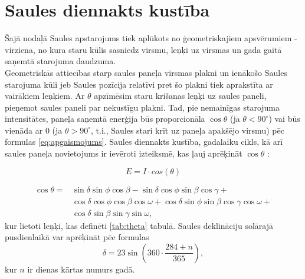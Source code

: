 
\section{Saules diennakts kustība}

Šajā nodaļā Saules apstarojums tiek aplūkots no ģeometriskajiem apsvērumiem - virziena, no kura staru kūlis sasniedz virsmu, leņķi uz virsmas un gada gaitā saņemtā starojuma daudzuma.\\
Ģeometriskās attiecības starp saules paneļa virsmas plakni un ienākošo Saules starojuma kūli jeb Saules pozīcija relatīvi pret šo plakni tiek aprakstīta ar vairākiem leņķiem. Ar $\theta$ apzīmēsim staru krišanas leņķi uz saules paneli, pieņemot saules paneli par nekustīgu plakni. Tad, pie nemainīgas starojuma intensitātes, paneļa saņemtā enerģija būs proporcionāla $\cos{\theta}$ (ja $\theta<90^\circ$) vai būs vienāda ar 0 (ja $\theta>90^\circ$, t.i., Saules stari krīt uz paneļa apakšējo virsmu) pēc formulas \ref{eq:apgaismojums}. Saules diennakts kustība, gadalaiku cikls, kā arī saules paneļa novietojums ir ievēroti izteiksmē, kas ļauj aprēķināt $\cos{\theta}$ \cite{ThermalProcesses}:

\begin{equation}
\label{eq:apgaismojums}
E = I \cdot cos(\theta)
\end{equation}

\begin{equation}
\label{eq:theta}
\begin{aligned}
	\cos{\theta} = {} & \sin{\delta} \sin{\phi} \cos{\beta} - \sin{\delta} \cos{\phi} \sin{\beta} \cos{\gamma} +                           \\
	                  & \cos{\delta} \cos{\phi} \cos{\beta} \cos{\omega} + \cos{\delta} \sin{\phi} \sin{\beta} \cos{\gamma} \cos{\omega} + \\
	                  & \cos{\delta} \sin{\beta} \sin{\gamma} \sin{\omega},
\end{aligned}
\end{equation}
kur lietoti leņķi, kas definēti \ref{tab:theta} tabulā. Saules deklināciju solārajā pusdienlaikā var aprēķināt pēc formulas
\begin{equation}
\label{eq:delta}
    \delta = 23 \sin \left( 360 \cdot \frac{284+n}{365} \right),
\end{equation}
kur $n$ ir dienas kārtas numurs gadā.


